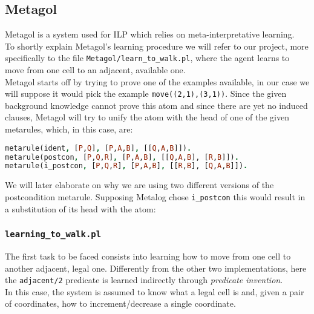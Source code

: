 \subsection{Metagol}
Metagol is a system used for ILP which relies on meta-interpretative learning.\\
To shortly explain Metagol's learning procedure we will refer to our project, more
specifically to the file \texttt{Metagol/learn\_to\_walk.pl}, where the agent learns to
move from one cell to an adjacent, available one.\\
Metagol starts off by trying to prove one of the examples available, in our case we will
suppose it would pick the example \texttt{move((2,1),(3,1))}. Since the given background
knowledge cannot prove this atom and since there are yet no induced clauses, Metagol will
try to unify the atom with the head of one of the given metarules, which, in this case, are:
\begin{lstlisting}[language=Prolog, caption=Metarules in \texttt{learning\_to\_walk.pl}]
metarule(ident, [P,Q], [P,A,B], [[Q,A,B]]).
metarule(postcon, [P,Q,R], [P,A,B], [[Q,A,B], [R,B]]).
metarule(i_postcon, [P,Q,R], [P,A,B], [[R,B], [Q,A,B]]).  
\end{lstlisting}
We will later elaborate on why we are using two different versions of the postcondition metarule.
Supposing Metalog chose \texttt{i\_postcon} this would result in a substitution of its head
with the atom:

\subsubsection{\texttt{learning\_to\_walk.pl}}
The first task to be faced consists into learning how to move from one cell to another adjacent, legal
one. Differently from the other two implementations, here the \texttt{adjacent/2} predicate is learned
indirectly through \emph{predicate invention}.\\
In this case, the system is assumed to know what a legal cell is and, given a pair of coordinates, how
to increment/decrease a single coordinate.
\[\]